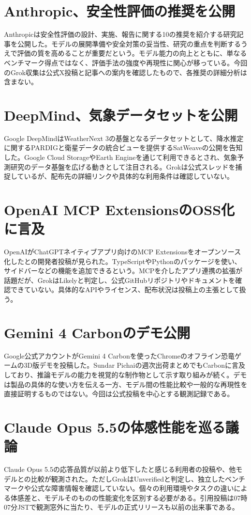 \section{Anthropic、安全性評価の推奨を公開}
Anthropicは安全性評価の設計、実施、報告に関する10の推奨を紹介する研究記事を公開した。モデルの展開準備や安全対策の妥当性、研究の重点を判断するうえで評価の質を高めることが重要だという。モデル能力の向上とともに、単なるベンチマーク得点ではなく、評価手法の強度や再現性に関心が移っている。今回のGrok収集は公式X投稿と記事への案内を確認したもので、各推奨の詳細分析は含まない。

\section{DeepMind、気象データセットを公開}
Google DeepMindはWeatherNext 3の基盤となるデータセットとして、降水推定に関するPARDIGと衛星データの統合ビューを提供するSatWeaveの公開を告知した。Google Cloud StorageやEarth Engineを通じて利用できるとされ、気象予測研究のデータ基盤を広げる動きとして注目される。Grokは公式スレッドを捕捉しているが、配布先の詳細リンクや具体的な利用条件は確認していない。

\section{OpenAI MCP ExtensionsのOSS化に言及}
OpenAIがChatGPTネイティブアプリ向けのMCP Extensionsをオープンソース化したとの開発者投稿が見られた。TypeScriptやPythonのパッケージを使い、サイドバーなどの機能を追加できるという。MCPを介したアプリ連携の拡張が話題だが、GrokはLikelyと判定し、公式GitHubリポジトリやドキュメントを確認できていない。具体的なAPIやライセンス、配布状況は投稿上の主張として扱う。

\section{Gemini 4 Carbonのデモ公開}
Google公式アカウントがGemini 4 Carbonを使ったChromeのオフライン恐竜ゲームの3D版デモを投稿した。Sundar Pichaiの週次出荷まとめでもCarbonに言及しており、推論モデルの能力を視覚的な制作物として示す取り組みが続く。デモは製品の具体的な使い方を伝える一方、モデル間の性能比較や一般的な再現性を直接証明するものではない。今回は公式投稿を中心とする観測記録である。

\section{Claude Opus 5.5の体感性能を巡る議論}
Claude Opus 5.5の応答品質が以前より低下したと感じる利用者の投稿や、他モデルとの比較が観測された。ただしGrokはUnverifiedと判定し、独立したベンチマークや公式な障害情報を確認していない。個々の利用環境やタスクの違いによる体感差と、モデルそのものの性能変化を区別する必要がある。引用投稿は07時07分JSTで観測窓外に当たり、モデルの正式リリースも以前の出来事である。
